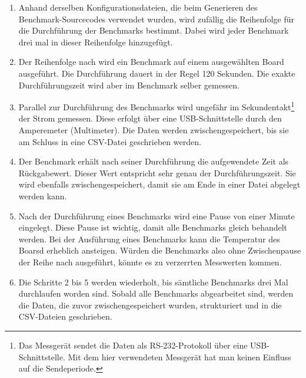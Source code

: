 \begin{enumerate}
\item Anhand derselben Konfigurationsdateien, die beim Generieren des Benchmark-Sourcecodes verwendet wurden, wird zufällig die Reihenfolge für die Durchführung der Benchmarks bestimmt. Dabei wird jeder Benchmark drei mal in dieser Reihenfolge hinzugefügt.
\item Der Reihenfolge nach wird ein Benchmark auf einem ausgewählten Board ausgeführt. Die Durchführung dauert in der Regel 120 Sekunden. Die exakte Durchführungszeit wird aber im Benchmark selber gemessen.
\item Parallel zur Durchführung des Benchmarks wird ungefähr im Sekundentakt\footnote{Das Messgerät sendet die Daten als RS-232-Protokoll über eine USB-Schnittstelle. Mit dem hier verwendeten Messgerät hat man keinen Einfluss auf die Sendeperiode.} der Strom gemessen. Diese erfolgt über eine USB-Schnittstelle durch den Amperemeter (Multimeter). Die Daten werden zwischengespeichert, bis sie am Schluss in eine CSV-Datei geschrieben werden.
\item Der Benchmark erhält nach seiner Durchführung die aufgewendete Zeit als Rückgabewert. Dieser Wert entspricht sehr genau der Durchführungszeit. Sie wird ebenfalls zwischengespeichert, damit sie am Ende in einer Datei abgelegt werden kann.
\item Nach der Durchführung eines Benchmarks wird eine Pause von einer Minute eingelegt. Diese Pause ist wichtig, damit alle Benchmarks gleich behandelt werden. Bei der Ausführung eines Benchmarks kann die Temperatur des Boarsd erheblich ansteigen. Würden die Benchmarks also ohne Zwischenpause der Reihe nach ausgeführt, könnte es zu verzerrten Messwerten kommen.
\item Die Schritte 2 bis 5 werden wiederholt, bis sämtliche Benchmarks drei Mal durchlaufen worden sind. Sobald alle Benchmarks abgearbeitet sind, werden die Daten, die zuvor zwischengespeichert wurden, strukturiert und in die CSV-Dateien geschrieben.
\end{enumerate}